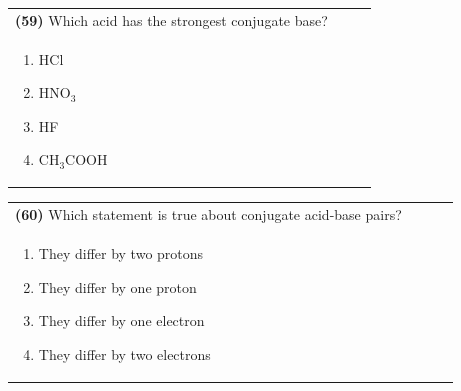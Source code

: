 \documentclass{article}
\begin{document}
\noindent\begin{tabular}{|p{0.9\linewidth}|}
\hline
\textbf{(59)} Which acid has the strongest conjugate base? \\[0.2cm]
\begin{minipage}{0.85\linewidth}
\begin{enumerate}[label=\alph*.]
\item HCl \item HNO$_3$ \item HF \item CH$_3$COOH
\end{enumerate}
\end{minipage}\\[0.2cm]
\hline
\end{tabular}

\noindent\begin{tabular}{|p{0.9\linewidth}|}
\hline
\textbf{(60)} Which statement is true about conjugate acid-base pairs? \\[0.2cm]
\begin{minipage}{0.85\linewidth}
\begin{enumerate}[label=\alph*.]
\item They differ by two protons \item They differ by one proton \item They differ by one electron \item They differ by two electrons
\end{enumerate}
\end{minipage}\\[0.2cm]
\hline
\end{tabular}
\end{document}
